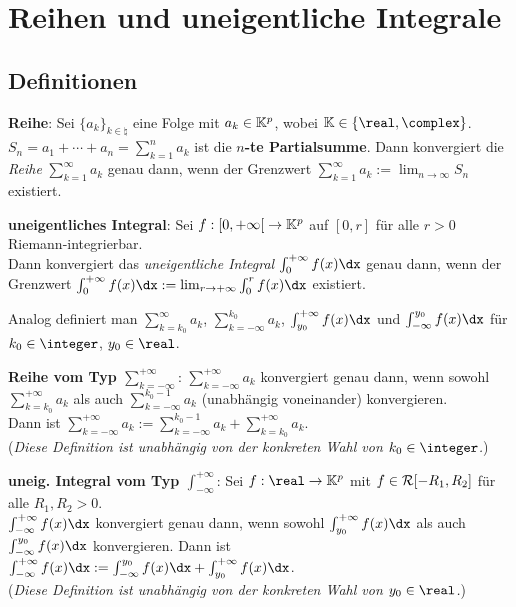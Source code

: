 \section{%
    Reihen und uneigentliche Integrale%
}

\subsection{%
    Definitionen%
}

\textbf{Reihe}:
Sei $\{a_k\}_{k \in \natural}$ eine Folge mit $a_k \in \mathbb{K}^p$, wobei
$\field \in \{\real, \complex\}$.
$S_n = a_1 + \dotsb + a_n = \sum_{k=1}^n a_k$ ist die
\textbf{$n$-te Partialsumme}.
Dann konvergiert die \emph{Reihe} $\sum_{k=1}^\infty a_k$ genau dann, wenn
der Grenzwert $\sum_{k=1}^\infty a_k := \lim_{n \to \infty} S_n$ existiert.

\textbf{uneigentliches Integral}:
Sei $f: \left[0, +\infty\right[ \rightarrow \mathbb{K}^p$ auf $[0, r]$
für alle $r > 0$ Riemann-integrierbar. \\
Dann konvergiert das \emph{uneigentliche Integral} $\int_0^{+\infty} f(x)\dx$
genau dann, wenn der Grenzwert
$\int_0^{+\infty} f(x)\dx := \lim_{r \to +\infty} \int_0^r f(x)\dx$ existiert.

Analog definiert man $\sum_{k=k_0}^\infty a_k$, $\sum_{k=-\infty}^{k_0} a_k$,
$\int_{y_0}^{+\infty} f(x)\dx$ und $\int_{-\infty}^{y_0} f(x)\dx$
für $k_0 \in \integer$, $y_0 \in \real$.

\linie

\textbf{Reihe vom Typ $\sum_{k=-\infty}^{+\infty}$}:
$\sum_{k=-\infty}^{+\infty} a_k$ konvergiert genau dann, wenn sowohl
$\sum_{k=k_0}^{+\infty} a_k$ als auch $\sum_{k=-\infty}^{k_0-1} a_k$
(unabhängig voneinander) konvergieren. \\
Dann ist $\sum_{k=-\infty}^{+\infty} a_k := \sum_{k=-\infty}^{k_0-1} a_k +
\sum_{k=k_0}^{+\infty} a_k$. \\
(\emph{Diese Definition ist unabhängig von der konkreten Wahl von
$k_0 \in \integer$.})

\textbf{uneig. Integral vom Typ $\int_{-\infty}^{+\infty}$}:
Sei $f: \real \rightarrow \field^p$ mit $f \in \mathcal{R}[-R_1, R_2]$ für
alle $R_1, R_2 > 0$. \\
$\int_{-\infty}^{+\infty} f(x)\dx$ konvergiert
genau dann, wenn sowohl $\int_{y_0}^{+\infty} f(x)\dx$ als auch
$\int_{-\infty}^{y_0} f(x)\dx$ konvergieren.
Dann ist $\int_{-\infty}^{+\infty} f(x)\dx :=
\int_{-\infty}^{y_0} f(x)\dx + \int_{y_0}^{+\infty} f(x)\dx$. \\
(\emph{Diese Definition ist unabhängig von der konkreten Wahl von
$y_0 \in \real$.})

